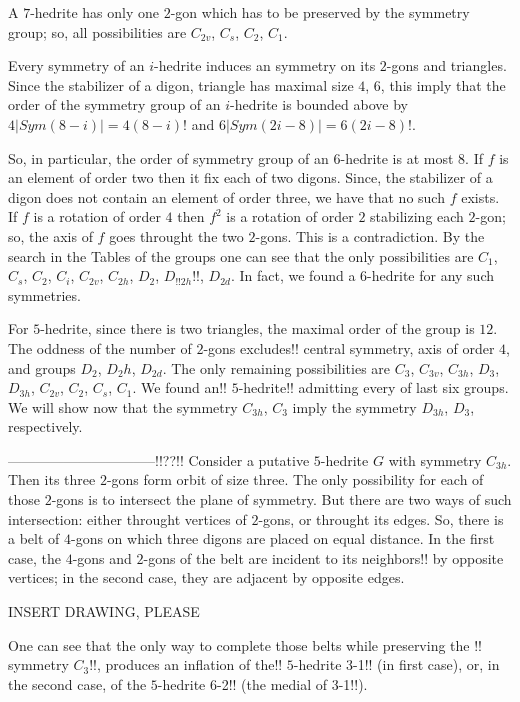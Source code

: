 \documentclass[12pt]{article}
\begin{document}
A $7$-hedrite has only one $2$-gon which has to be preserved by the symmetry group; so, all possibilities are $C_{2v}$, $C_s$, $C_2$, $C_1$.

Every symmetry of an $i$-hedrite induces an symmetry on its $2$-gons and triangles. Since the stabilizer of a digon, triangle has maximal size $4$, $6$, this imply that the order of the symmetry group of an $i$-hedrite is bounded above by $4|Sym(8-i)|=4(8-i)!$ and $6|Sym(2i-8)|=6(2i-8)!$.

So, in particular, the order of symmetry group of an $6$-hedrite is at most $8$. If $f$ is an element of order two then it fix each of two digons. Since, the stabilizer of a digon does not contain an element of order three, we have that no such $f$ exists. If $f$ is a rotation of order $4$ then $f^2$ is a rotation of order $2$ stabilizing each $2$-gon; so, the axis of $f$ goes throught the two $2$-gons. This is a contradiction. By the search in the Tables of the groups one can see that the only possibilities are $C_1$, $C_s$, $C_2$, $C_i$, $C_{2v}$, $C_{2h}$, $D_2$, $D_{!!2h}!!$, $D_{2d}$. In fact, we found a $6$-hedrite for any such symmetries.

For $5$-hedrite, since there is two triangles, the maximal order of the group is $12$. The oddness of the number of $2$-gons excludes!! central symmetry, axis of order $4$, and groups $D_2$, $D_2h$, $D_{2d}$. The only remaining possibilities are $C_3$, $C_{3v}$, $C_{3h}$, $D_3$, $D_{3h}$, $C_{2v}$, $C_2$, $C_s$, $C_1$. We found an!! $5$-hedrite!! admitting every of last six groups. We will show now that the symmetry $C_{3h}$, $C_3$ imply the symmetry $D_{3h}$, $D_3$, respectively.





--------------------------------!!??!!
Consider a putative $5$-hedrite $G$ with symmetry $C_{3h}$. Then its three $2$-gons form orbit of size three. The only possibility for each of those $2$-gons is to intersect the plane of symmetry. But there are two ways of such intersection: either throught vertices of $2$-gons, or throught its edges. So, there is a belt of $4$-gons on which three digons are placed on equal distance. In the first case, the $4$-gons and $2$-gons of the belt are incident to 
its neighbors!! by opposite vertices; in the second case, they are adjacent by opposite edges.

INSERT DRAWING, PLEASE

One can see that the only way to complete those belts while 
preserving the !! symmetry $C_3$!!, produces an inflation of 
the!! $5$-hedrite 3-1!! (in first case), or, in the second case, 
of the $5$-hedrite 6-2!! (the medial of 3-1!!).
\end{document}
